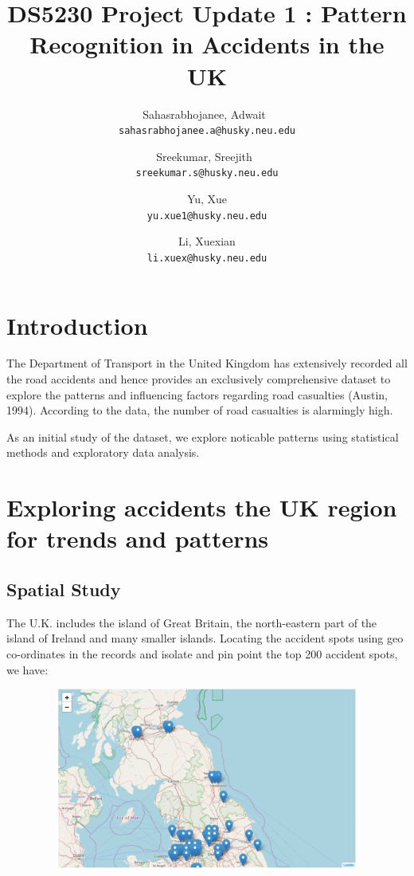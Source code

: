 \documentclass[a4paper, 10pt]{article}
\begin{document}
\title{DS5230 Project Update 1 : Pattern Recognition in Accidents in the UK}


\author{
  Sahasrabhojanee, Adwait\ \\     \texttt{sahasrabhojanee.a@husky.neu.edu}
  \and
  Sreekumar, Sreejith\  \\ \texttt{sreekumar.s@husky.neu.edu}
  \and
  Yu, Xue \\  \texttt{yu.xue1@husky.neu.edu}
  \and
  Li, Xuexian  \\ \texttt{li.xuex@husky.neu.edu}
}
\maketitle
\section{Introduction}
The Department of Transport in the United Kingdom has extensively recorded all the road accidents and hence provides an exclusively comprehensive dataset to
explore the patterns and influencing factors regarding road casualties (Austin, 1994). According to the data, the number of road casualties is alarmingly high.

  As an initial study of the dataset, we explore noticable patterns using statistical methods and exploratory data analysis. 

  \section{Exploring accidents the UK region for trends and patterns }

\subsection{Spatial Study}  
  The U.K. includes the island of Great Britain, the north-eastern part of the island of Ireland and many smaller islands.  Locating the accident spots
  using geo co-ordinates in the records and isolate and pin point the top 200 accident spots, we have:

    \begin{center}
      \includegraphics[width=70cm,height=6cm, scale=0.4,keepaspectratio]{map1.png}
    \end{center}
\end{document}
